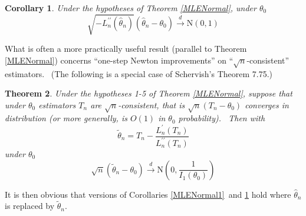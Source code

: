 \documentclass{article}
\newtheorem{theorem}{Theorem}
\newtheorem{corollary}[theorem]{Corollary}
\begin{document}
\begin{corollary}
\label{MLENormal2}Under the hypotheses of Theorem \ref{MLENormal}, under
$\theta_{0}$%
\[
\sqrt{-L_{n}^{\prime\prime}\left(  \hat{\theta}_{n}\right)  }\left(
\hat{\theta}_{n}-\theta_{0}\right)  \overset{d}{\rightarrow}\text{N}\left(
0,1\right)
\]

\end{corollary}

What is often a more practically useful result (parallel to Theorem
\ref{MLENormal}) concerns ``one-step Newton improvements'' on ``$\sqrt{n}%
$-consistent'' estimators. \ (The following is a special case of Schervish's
Theorem 7.75.)

\begin{theorem}
\label{NewtonNormal}Under the hypotheses 1-5 of Theorem \ref{MLENormal},
suppose that under $\theta_{0}$ estimators $T_{n}$ are $\sqrt{n}$-consistent,
that is $\sqrt{n}\left(  T_{n}-\theta_{0}\right)  $ converges in distribution
(or more generally, is $O\left(  1\right)  $ in $\theta_{0}$ probability).
\ Then with%
\[
\tilde{\theta}_{n}=T_{n}-\frac{L_{n}^{\prime}\left(  T_{n}\right)  }%
{L_{n}^{\prime\prime}\left(  T_{n}\right)  }%
\]
under $\theta_{0}$%
\[
\sqrt{n}\left(  \tilde{\theta}_{n}-\theta_{0}\right)  \overset{d}{\rightarrow
}\text{N}\left(  0,\frac{1}{I_{1}\left(  \theta_{0}\right)  }\right)
\]

\end{theorem}

It is then obvious that versions of Corollaries \ref{MLENormal1}\ and
\ref{MLENormal2} hold where $\hat{\theta}_{n}$ is replaced by $\tilde{\theta
}_{n}$.
\end{document}
